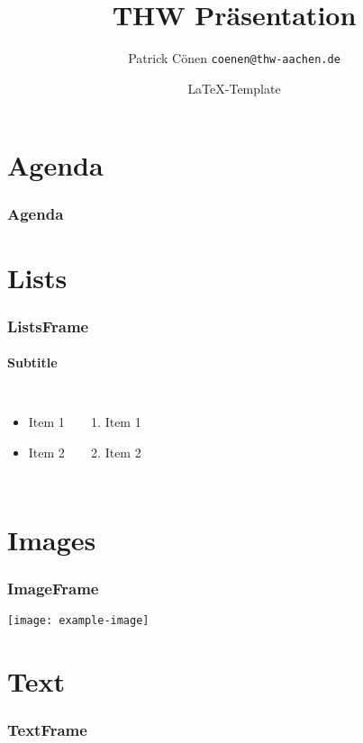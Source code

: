 \documentclass{beamer}
\title{THW Präsentation}
\author{Patrick Cönen \texttt{coenen@thw-aachen.de}}
\date{\LaTeX-Template\\\insertauthor}
\begin{document}
\begin{frame}
  \titlepage
\end{frame}

\section*{Agenda}
\begin{frame}
  \frametitle{Agenda}
  \tableofcontents
\end{frame}

\section{Lists}

\begin{frame}
  \frametitle{ListsFrame}
  \framesubtitle{Subtitle}
  \begin{columns}
    \begin{itemize}
      \item<1->{Item 1}
      \item<2->{Item 2}
    \end{itemize}
    \begin{enumerate}
      \item<1->{Item 1}
      \item<2->{Item 2}
    \end{enumerate}
  \end{columns}
\end{frame}

\section{Images}

\begin{frame}
  \frametitle{ImageFrame}
    \centering
    \texttt{[image: example-image]}
\end{frame}

\section{Text}

\begin{frame}
  \frametitle{TextFrame}
  \small{}
  \blindtext
\end{frame}
\end{document}

